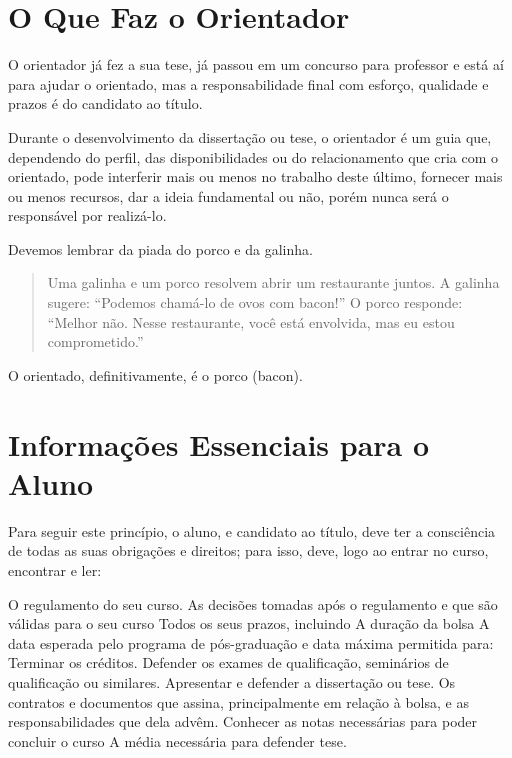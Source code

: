 \section{O Que Faz o Orientador}

O orientador já fez a sua tese, já passou em um concurso para professor e está aí para ajudar o orientado, mas a responsabilidade final com esforço, qualidade e prazos é do candidato ao título.

Durante o desenvolvimento da dissertação ou tese, o orientador é um guia que, dependendo do perfil, das disponibilidades ou do relacionamento que cria com o orientado, pode interferir mais ou menos no trabalho deste último, fornecer mais ou menos recursos, dar a ideia fundamental ou não, porém nunca será o responsável por realizá-lo.

Devemos lembrar da piada do porco e da galinha. 
\begin{quote}
    Uma galinha e um porco resolvem abrir um restaurante juntos.
A galinha sugere: ``Podemos chamá-lo de ovos com bacon!''
O porco responde: ``Melhor não. Nesse restaurante, você está envolvida, mas eu estou comprometido.''
\end{quote}
O orientado, definitivamente, é o porco (bacon).


\section{Informações Essenciais para o Aluno}

Para seguir este princípio, o aluno, e candidato ao título, deve ter a consciência de todas as suas obrigações e direitos; para isso, deve, logo ao entrar no curso, encontrar e ler:

\begin{outline}
\1	O regulamento do seu curso.
\1	As decisões tomadas após o regulamento e que são válidas para o seu curso
\1	Todos os seus prazos, incluindo
\2	A duração da bolsa
\2	A data esperada pelo programa de pós-graduação e data máxima permitida para:
\3	Terminar os créditos.
\3	Defender os exames de qualificação, seminários de qualificação ou similares.
\3	Apresentar e defender a dissertação ou tese.
\1	Os contratos e documentos que assina, principalmente em relação à bolsa, e as responsabilidades que dela advêm.
\1	Conhecer as notas necessárias para poder concluir o curso
\2	A média necessária para defender tese.
\end{outline}





